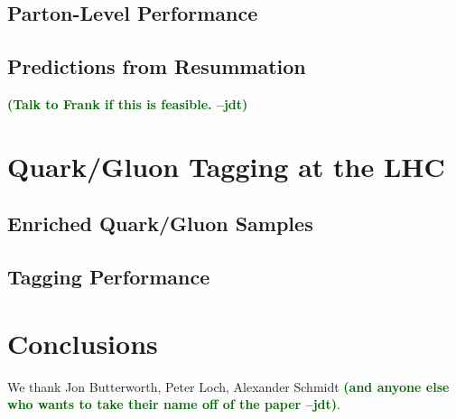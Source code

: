 \documentclass[11pt,letterpaper]{article}
\newcommand{\jdt}[1]{\textbf{\textcolor{darkgreen}{(#1 --jdt)}}}
\begin{document}
\subsection{Parton-Level Performance}



\subsection{Predictions from Resummation}

\jdt{Talk to Frank if this is feasible.}

\section{Quark/Gluon Tagging at the LHC}
\label{sec:pp}

\subsection{Enriched Quark/Gluon Samples}

\subsection{Tagging Performance}


\section{Conclusions}
\label{sec:conclude}




\begin{acknowledgments}
We thank Jon Butterworth, Peter Loch, Alexander Schmidt \jdt{and anyone else who wants to take their name off of the paper}.

\end{acknowledgments}




\end{document}

